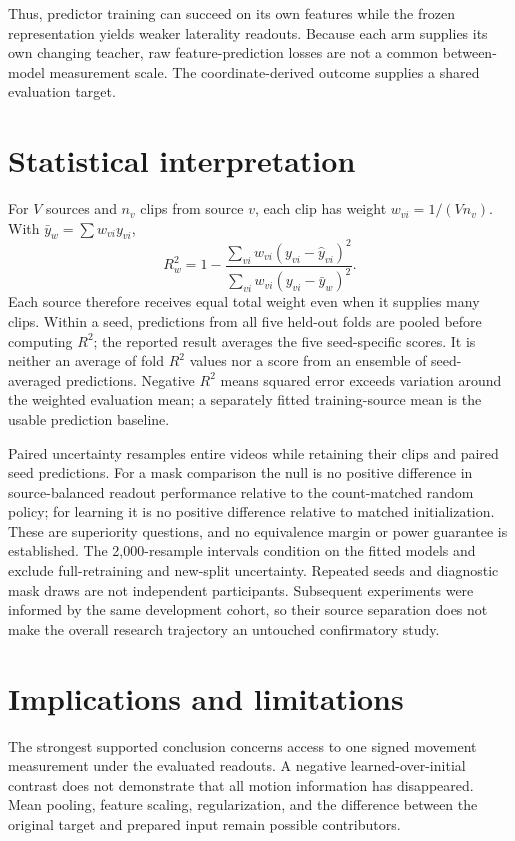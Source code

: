 \documentclass{article}
\begin{document}
Thus, predictor training can succeed on its own features while the frozen representation yields weaker laterality readouts. Because each arm supplies its own changing teacher, raw feature-prediction losses are not a common between-model measurement scale. The coordinate-derived outcome supplies a shared evaluation target.

\section{Statistical interpretation}\label{statistical-interpretation}

For \(V\) sources and \(n_v\) clips from source \(v\), each clip has weight \(w_{vi}=1/(Vn_v)\). With \(\bar y_w=\sum w_{vi}y_{vi}\), \[
R^2_w=1-\frac{\sum_{vi}w_{vi}(y_{vi}-\hat y_{vi})^2}
{\sum_{vi}w_{vi}(y_{vi}-\bar y_w)^2}.
\] Each source therefore receives equal total weight even when it supplies many clips. Within a seed, predictions from all five held-out folds are pooled before computing \(R^2\); the reported result averages the five seed-specific scores. It is neither an average of fold \(R^2\) values nor a score from an ensemble of seed-averaged predictions. Negative \(R^2\) means squared error exceeds variation around the weighted evaluation mean; a separately fitted training-source mean is the usable prediction baseline.

Paired uncertainty resamples entire videos while retaining their clips and paired seed predictions. For a mask comparison the null is no positive difference in source-balanced readout performance relative to the count-matched random policy; for learning it is no positive difference relative to matched initialization. These are superiority questions, and no equivalence margin or power guarantee is established. The 2,000-resample intervals condition on the fitted models and exclude full-retraining and new-split uncertainty. Repeated seeds and diagnostic mask draws are not independent participants. Subsequent experiments were informed by the same development cohort, so their source separation does not make the overall research trajectory an untouched confirmatory study.

\section{Implications and limitations}\label{implications-and-limitations}

The strongest supported conclusion concerns access to one signed movement measurement under the evaluated readouts. A negative learned-over-initial contrast does not demonstrate that all motion information has disappeared. Mean pooling, feature scaling, regularization, and the difference between the original target and prepared input remain possible contributors.
\end{document}
